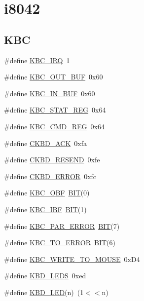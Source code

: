 \hypertarget{group__i8042}{}\section{i8042}
\label{group__i8042}
\subsection*{K\+BC}
\begin{DoxyCompactItemize}
\item 
\#define \hyperlink{group__i8042_ga16c5827f043d82f87c726c2d4369c11d}{K\+B\+C\+\_\+\+I\+RQ}~1
\item 
\#define \hyperlink{group__i8042_ga1ccde68b2b6d4e45b50eef1403e10bb7}{K\+B\+C\+\_\+\+O\+U\+T\+\_\+\+B\+UF}~0x60
\item 
\#define \hyperlink{group__i8042_gaac9289c99cf0a693a211da6d6cb1bb65}{K\+B\+C\+\_\+\+I\+N\+\_\+\+B\+UF}~0x60
\item 
\#define \hyperlink{group__i8042_ga34b14687d83496940a236351fbbb1aea}{K\+B\+C\+\_\+\+S\+T\+A\+T\+\_\+\+R\+EG}~0x64
\item 
\#define \hyperlink{group__i8042_ga6d57c7927a10f638c83046b52c8caac9}{K\+B\+C\+\_\+\+C\+M\+D\+\_\+\+R\+EG}~0x64
\item 
\#define \hyperlink{group__i8042_ga7bff22c3c71947a24f8f0922d33f0f5f}{C\+K\+B\+D\+\_\+\+A\+CK}~0xfa
\item 
\#define \hyperlink{group__i8042_gafbc8d3dd7a27e8c020c9991578358def}{C\+K\+B\+D\+\_\+\+R\+E\+S\+E\+ND}~0xfe
\item 
\#define \hyperlink{group__i8042_ga318cf5bf776792ffc02a53fb7e8082df}{C\+K\+B\+D\+\_\+\+E\+R\+R\+OR}~0xfc
\item 
\#define \hyperlink{group__i8042_ga36930de8a703505c95fe133095dcfe06}{K\+B\+C\+\_\+\+O\+BF}~\hyperlink{video__gr_8c_a3a8ea58898cb58fc96013383d39f482c}{B\+IT}(0)
\item 
\#define \hyperlink{group__i8042_gac1649d41f8ba9a02fa70ec4e600d5e4a}{K\+B\+C\+\_\+\+I\+BF}~\hyperlink{video__gr_8c_a3a8ea58898cb58fc96013383d39f482c}{B\+IT}(1)
\item 
\#define \hyperlink{group__i8042_ga795488c410d300a8ea2afb4c82d2e6cc}{K\+B\+C\+\_\+\+P\+A\+R\+\_\+\+E\+R\+R\+OR}~\hyperlink{video__gr_8c_a3a8ea58898cb58fc96013383d39f482c}{B\+IT}(7)
\item 
\#define \hyperlink{group__i8042_ga22767b69efd74d1f3631b8803a63b939}{K\+B\+C\+\_\+\+T\+O\+\_\+\+E\+R\+R\+OR}~\hyperlink{video__gr_8c_a3a8ea58898cb58fc96013383d39f482c}{B\+IT}(6)
\item 
\#define \hyperlink{group__i8042_ga1747d582dc5a6d634f05016ece9625d8}{K\+B\+C\+\_\+\+W\+R\+I\+T\+E\+\_\+\+T\+O\+\_\+\+M\+O\+U\+SE}~0x\+D4
\item 
\#define \hyperlink{group__i8042_gac69c14ded6b68de11e5caaa6bcddf8fc}{K\+B\+D\+\_\+\+L\+E\+DS}~0xed
\item 
\#define \hyperlink{group__i8042_ga1b7a8d18cf6c99a32610259ae861eb1f}{K\+B\+D\+\_\+\+L\+ED}(n)~(1$<$$<$n)
\end{DoxyCompactItemize}
